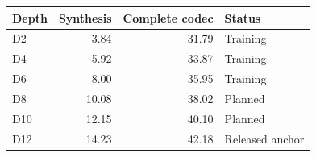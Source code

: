 \begin{tabular}{lrrl}
\toprule
Depth & Synthesis & Complete codec & Status \\
\midrule
D2 & 3.84 & 31.79 & Training \\
D4 & 5.92 & 33.87 & Training \\
D6 & 8.00 & 35.95 & Training \\
D8 & 10.08 & 38.02 & Planned \\
D10 & 12.15 & 40.10 & Planned \\
D12 & 14.23 & 42.18 & Released anchor \\
\bottomrule
\end{tabular}
